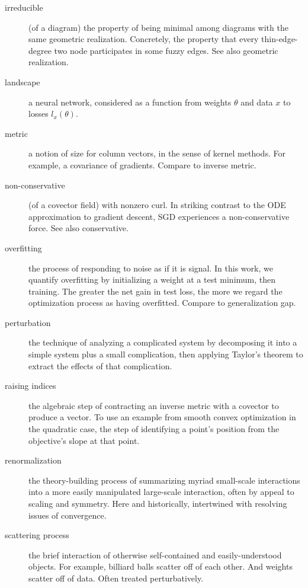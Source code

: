 \documentclass{article}
\theoremstyle{plain}
\theoremstyle{definition}
\begin{document}
\begin{description}
        \item[irreducible] (of a diagram) the property of being minimal among diagrams with the same geometric realization.  Concretely, the property that every thin-edge-degree two node participates in some fuzzy edges.  See also geometric realization. 
        \item[landscape] a neural network, considered as a function from weights $\theta$ and data $x$ to losses $l_x(\theta)$. 
        \item[metric] a notion of size for column vectors, in the sense of kernel methods.  For example, a covariance of gradients.  Compare to inverse metric.
        \item[non-conservative] (of a covector field) with nonzero curl.  In striking contrast to the ODE approximation to gradient descent, SGD experiences a non-conservative force.  See also conservative.
        \item[overfitting] the process of responding to noise as if it is signal.  In this work, we quantify overfitting by initializing a weight at a test minimum, then training.  The greater the net gain in test loss, the more we regard the optimization process as having overfitted.  Compare to generalization gap.
        \item[perturbation] the technique of analyzing a complicated system by decomposing it into a simple system plus a small complication, then applying Taylor's theorem to extract the effects of that complication.  
        \item[raising indices] the algebraic step of contracting an inverse metric with a covector to produce a vector.  To use an example from smooth convex optimization in the quadratic case, the step of identifying a point's position from the objective's slope at that point.
        \item[renormalization] the theory-building process of summarizing myriad small-scale interactions into a more easily manipulated large-scale interaction, often by appeal to scaling and symmetry.  Here and historically, intertwined with resolving issues of convergence.  
        \item[scattering process] the brief interaction of otherwise self-contained and easily-understood objects.  For example, billiard balls scatter off of each other.  And weights scatter off of data.  Often treated perturbatively. 

\end{description}
\end{document}

